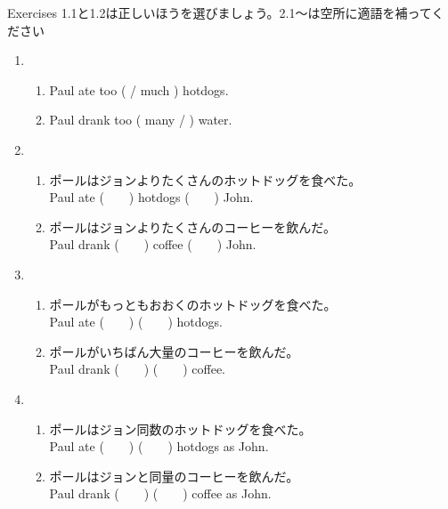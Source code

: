 \documentclass[aspectratio=169,xcolor={dvipsnames,table}]{beamer}
\begin{document}
\begin{frame}[plain]{Exercises}
1.1と1.2は正しいほうを選びましょう。2.1～は空所に適語を補ってください%
\hfill{\scriptsize {}}
 \begin{enumerate}
  \item \begin{enumerate}
	 \item<1-> Paul ate too (  / much ) hotdogs.
	 \item<1-> Paul drank too ( many / ) water.
	\end{enumerate}
  \item \begin{enumerate}
	 \item<1-> ポールはジョンよりたくさんのホットドッグを食べた。\\
	       Paul ate (~~~~) hotdogs (~~~~) John.
	 \item<1-> ポールはジョンよりたくさんのコーヒーを飲んだ。\\
	       Paul drank (~~~~) coffee (~~~~) John.
	\end{enumerate}
  \item \begin{enumerate}
	 \item<1-> ポールがもっともおおくのホットドッグを食べた。\\
	       Paul ate (~~~~) (~~~~) hotdogs.
	 \item<1-> ポールがいちばん大量のコーヒーを飲んだ。\\
	       Paul drank (~~~~) (~~~~) coffee.
	\end{enumerate}
  \item \begin{enumerate}
	 \item<1-> ポールはジョン同数のホットドッグを食べた。\\
	       Paul ate (~~~~) (~~~~) hotdogs as John.
	 \item<1-> ポールはジョンと同量のコーヒーを飲んだ。\\
	       Paul drank (~~~~) (~~~~) coffee as John.
	\end{enumerate}
 \end{enumerate}
\end{frame}
\end{document}
